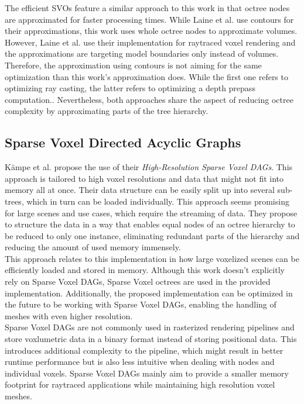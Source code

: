 \noindent
The efficient \ac{SVO}s feature a similar approach to this work in that octree nodes are approximated for faster 
processing times. While Laine et al. use contours for their approximations, this work uses whole octree nodes 
to approximate volumes. \\

\noindent
However, Laine et al. use their implementation for raytraced voxel rendering and the approximations are targeting 
model boundaries only instead of volumes. Therefore, the approximation using contours is not aiming for the same 
optimization than this work's approximation does. While the first one refers to optimizing ray casting, the latter 
refers to optimizing a depth prepass computation.. Nevertheless, both approaches share the aspect of reducing 
octree complexity by approximating parts of the tree hierarchy.


\subsection*{Sparse Voxel Directed Acyclic Graphs}

Kämpe et al. \cite{Kampe2013} propose the use of their \emph{High-Resolution Sparse Voxel \ac{DAG}s}. This approach 
is tailored to high voxel resolutions and data that might not fit into memory all at once. Their data structure can 
be easily split up into several sub-trees, which in turn can be loaded individually. This approach seems promising 
for large scenes and use cases, which require the streaming of data. They propose to structure the data in a way that 
enables equal nodes of an octree hierarchy to be reduced to only one instance, eliminating redundant parts of the 
hierarchy and reducing the amount of used memory immensely. \\

\noindent
This approach relates to this implementation in how large voxelized scenes can be efficiently loaded and stored in 
memory. Although this work doesn't explicitly rely on Sparse Voxel \ac{DAG}s, Sparse Voxel octrees are used in the 
provided implementation. Additionally, the proposed implementation can be optimized in the future to be working 
with Sparse Voxel \ac{DAG}s, enabling the handling of meshes with even higher resolution. \\

\noindent
Sparse Voxel \ac{DAG}s are not commonly used in rasterized rendering pipelines and store voxlumetric data in a binary 
format instead of storing positional data. This introduces additional complexity to the pipeline, which might result in 
better runtime performance but is also less intuitive when dealing with nodes and individual voxels. Sparse Voxel 
\ac{DAG}s mainly aim to provide a smaller memory footprint for raytraced applications while maintaining high resolution 
voxel meshes. \\

